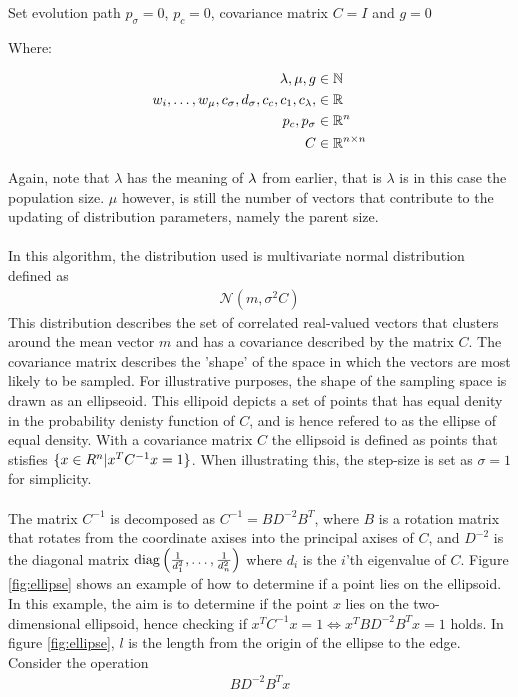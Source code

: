 Set evolution path $p_{\sigma} = 0$, $p_{c} = 0$, covariance matrix $C = I$ and $g = 0$

Where:

\begin{align}
\lambda, \mu, g &\in \mathbb{N}\\
w_i,\dots,w_{\mu}, c_{\sigma}, d_{\sigma}, c_c, c_1, c_{\lambda}, &\in \mathbb{R}\\
p_{c}, p_{\sigma} &\in \mathbb{R}^{n}\\
C &\in \mathbb{R}^{n \times n}
\end{align}

Again, note that $\lambda$ has the meaning of $\lambda$ from earlier, that
is $\lambda$ is in this case the population size. $\mu$ however, is still the number
of vectors that contribute to the updating of distribution parameters, namely the 
parent size.\\
\\
In this algorithm, the distribution used is multivariate normal distribution defined
as 
\begin{align}
\mathcal{N} \left( m,  \sigma^2 C \right)
\end{align}
This distribution describes the set of correlated real-valued vectors that
clusters around the mean vector $m$ and has a covariance described by the
matrix $C$. The covariance matrix describes the 'shape' of the space in which 
the vectors are most likely to be sampled. For illustrative purposes,
the shape of the sampling space is drawn as an ellipseoid.
This ellipoid depicts a set of points that has equal denity 
in the probability denisty function of $C$, and is hence refered to 
as the ellipse of equal density.
With a covariance matrix $C$
the ellipsoid is defined as points that stisfies
$\{x \in R^{n} | x^{T} C^{-1} x = 1\}$.
When illustrating this, the step-size is set as $\sigma = 1$ for simplicity.\\
\\
The matrix $C^{-1}$ is decomposed as $C^{-1} = B D^{-2} B^T$, where $B$ is a rotation 
matrix that rotates from the coordinate axises into the principal axises of $C$, and 
$D^{-2}$ is the diagonal matrix 
$\text{diag} \left( \frac{1}{d_{1}^2},\dots, \frac{1}{d_{n}^2} \right)$
where $d_{i}$ is the $i$'th eigenvalue of $C$. Figure \ref{fig:ellipse} shows an example
of how to determine if a point lies on the ellipsoid. In this example, the aim is to 
determine if the point $x$ lies on the two-dimensional ellipsoid, hence checking if 
$x^{T} C^{-1} x = 1 \Leftrightarrow x^{T} B D^{-2} B^T x = 1 $ holds. In figure 
\ref{fig:ellipse}, $l$ is the length from the origin of the ellipse to the edge.
Consider the operation
\begin{align}
B D^{-2} B^T x \label{eq:rotscal}
\end{align}

